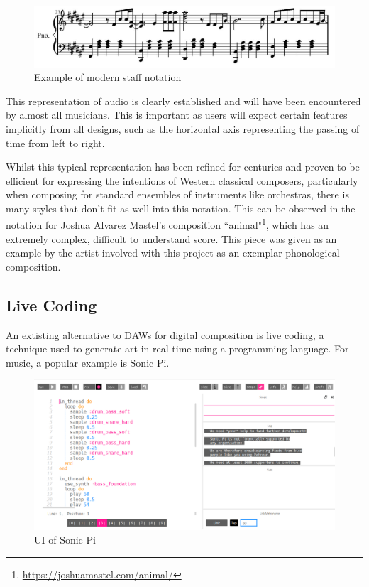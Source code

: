 \documentclass[12pt,a4paper,twoside,openright]{report}
\begin{document}
\begin{figure}[h]
    \centering
    \includegraphics[scale=0.7]{images/modern staff notation.png}
    \caption{Example of modern staff notation}
    \label{fig:staff_not}
\end{figure}

This representation of audio is clearly established and will have been encountered by almost all musicians. This is important as users will expect certain features implicitly from all designs, such as the horizontal axis representing the passing of time from left to right.

Whilst this typical representation has been refined for centuries and proven to be efficient for expressing the intentions of Western classical composers, particularly when composing for standard ensembles of instruments like orchestras, there is many styles that don't fit as well into this notation. This can be observed in the notation for Joshua Alvarez Mastel's composition ``animal"\footnote{\url{https://joshuamastel.com/animal/}}, which has an extremely complex, difficult to understand score. This piece was given as an example by the artist involved with this project as an exemplar phonological composition.

\subsection{Live Coding}
An extisting alternative to DAWs for digital composition is live coding, a technique used to generate art in real time using a programming language. For music, a popular example is Sonic Pi.

\begin{figure}[h]
    \centering
    \includegraphics[scale=0.4]{images/sonicpi.png}
    \caption{UI of Sonic Pi}
    \label{fig:sonic_pi}
\end{figure}
\end{document}
